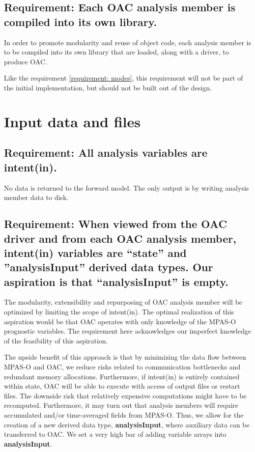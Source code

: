 \documentclass[11pt]{report}
\begin{document}
\subsection{{\color{red} Requirement:} Each OAC analysis member is compiled into its own library.}
In order to promote modularity and reuse of object code, each analysis member is to be compiled into its own library that are loaded, along with a driver, to produce OAC.

Like the requirement \ref{requirement: modes}, this requirement will not be part of the initial implementation, but should not be built out of the design.

\newpage
\section{Input data and files}

\subsection{{\color{green} Requirement:} All analysis variables are intent(in).}
No data is returned to the forward model.  The only output is by writing analysis member data to disk.

\subsection{{\color{red} Requirement:} When viewed from the OAC driver and from each OAC analysis member, intent(in) variables are ``state'' and ''analysisInput'' derived data types. Our aspiration is that ``analysisInput'' is empty.}
The modularity, extensibility and repurposing of OAC analysis member will be optimized by limiting the scope of intent(in). The optimal realization of this aspiration would be that OAC operates with only knowledge of the MPAS-O prognostic variables. The requirement here acknowledges our imperfect knowledge of the feasibility of this aspiration.

The upside benefit of this approach is that by minimizing the data flow between MPAS-O and OAC, we reduce risks related to communication bottlenecks and redundant memory allocations. Furthermore, if intent(in) is entirely contained within state, OAC will be able to execute with access of output files or restart files. The downside risk that relatively expensive computations might have to be recomputed. Furthermore, it may turn out that analysis members will require accumulated and/or time-averaged fields from MPAS-O. Thus, we allow for the creation of a new derived data type, {\bf analysisInput}, where auxiliary data can be transferred to OAC. We set a very high bar of adding variable arrays into {\bf analysisInput}.
\end{document}
